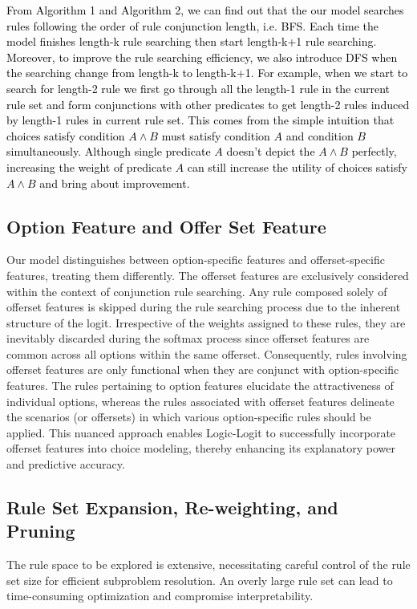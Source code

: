 \documentclass{article} %
\begin{document}
\textcolor{black}{
From Algorithm 1 and Algorithm 2, we can find out that the our model searches rules following the order of rule conjunction length, i.e. BFS. Each time the model finishes length-k rule searching then start length-k+1 rule searching. Moreover, to improve the rule searching efficiency, we also introduce DFS when the searching change from length-k to length-k+1. For example, when we start to search for length-2 rule we first go through all the length-1 rule in the current rule set and form conjunctions with other predicates to get length-2 rules induced by length-1 rules in current rule set. This comes from the simple intuition that choices satisfy condition $A \wedge B$ must satisfy condition $A$ and condition $B$ simultaneously. Although single predicate $A$ doesn't depict the $A \wedge B$ perfectly, increasing the weight of predicate $A$ can still increase the utility of choices satisfy $A \wedge B$ and bring about improvement. 
}

\subsection{Option Feature and Offer Set Feature}
Our model distinguishes between option-specific features and offerset-specific features, treating them differently. The offerset features are exclusively considered within the context of conjunction rule searching. Any rule composed solely of offerset features is skipped during the rule searching process due to the inherent structure of the logit. Irrespective of the weights assigned to these rules, they are inevitably discarded during the softmax process since offerset features are common across all options within the same offerset. Consequently, rules involving offerset features are only functional when they are conjunct with option-specific features. The rules pertaining to option features elucidate the attractiveness of individual options, whereas the rules associated with offerset features delineate the scenarios (or offersets) in which various option-specific rules should be applied. This nuanced approach enables Logic-Logit to successfully incorporate offerset features into choice modeling, thereby enhancing its explanatory power and predictive accuracy.

\subsection{Rule Set Expansion, Re-weighting, and Pruning}
The rule space to be explored is extensive, necessitating careful control of the rule set size for efficient subproblem resolution. An overly large rule set can lead to time-consuming optimization and compromise interpretability.
\end{document}
